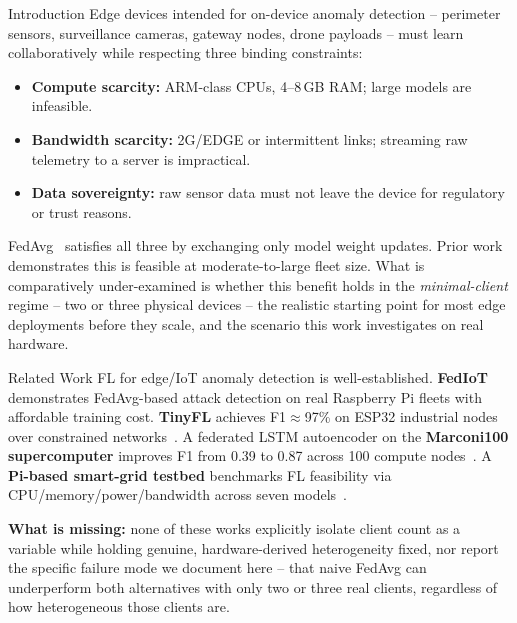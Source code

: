 \documentclass[final]{beamer}
\newlength{\colwidth}
\begin{document}
\begin{frame}[t]
\begin{columns}[t]
\begin{column}{\colwidth}
  \begin{block}{Introduction}
    \small
    Edge devices intended for on-device anomaly detection -- perimeter
    sensors, surveillance cameras, gateway nodes, drone payloads -- must
    learn collaboratively while respecting three binding constraints:
    \vspace{0.2em}
    \begin{itemize}\setlength\itemsep{0.15em}
      \item \textbf{Compute scarcity:} ARM-class CPUs, 4--8\,GB RAM;
            large models are infeasible.
      \item \textbf{Bandwidth scarcity:} 2G/EDGE or intermittent links;
            streaming raw telemetry to a server is impractical.
      \item \textbf{Data sovereignty:} raw sensor data must not leave
            the device for regulatory or trust reasons.
    \end{itemize}
    \vspace{0.2em}
    FedAvg~\cite{fedavg} satisfies all three by exchanging only model
    weight updates. Prior work demonstrates this is feasible at moderate-to-large
    fleet size. What is comparatively under-examined is whether this benefit
    holds in the \textit{minimal-client} regime -- two or three physical
    devices -- the realistic starting point for most edge deployments before
    they scale, and the scenario this work investigates on real hardware.
  \end{block}

  \begin{block}{Related Work}
    \small
    FL for edge/IoT anomaly detection is well-established.
    \textbf{FedIoT}~\cite{fediot} demonstrates FedAvg-based attack
    detection on real Raspberry Pi fleets with affordable training cost.
    \textbf{TinyFL} achieves F1$\approx$97\% on ESP32 industrial nodes
    over constrained networks~\cite{tinyfl}. A federated LSTM autoencoder
    on the \textbf{Marconi100 supercomputer} improves F1 from 0.39 to 0.87
    across 100 compute nodes~\cite{marconi}. A \textbf{Pi-based smart-grid
    testbed} benchmarks FL feasibility via CPU/memory/power/bandwidth across
    seven models~\cite{smartgrid}.

    \vspace{0.2em}
    \textbf{What is missing:} none of these works explicitly isolate client
    count as a variable while holding genuine, hardware-derived heterogeneity
    fixed, nor report the specific failure mode we document here -- that
    naive FedAvg can underperform both alternatives with only two or three
    real clients, regardless of how heterogeneous those clients are.
  \end{block}


\end{column}
\end{columns}
\end{frame}
\end{document}
